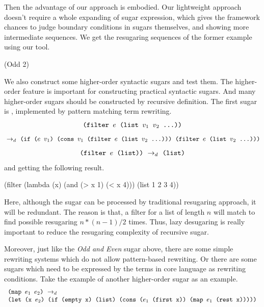 Then the advantage of our approach is embodied. Our lightweight approach doesn't require a whole expanding of sugar expression, which gives the framework chances to judge boundary conditions in sugars themselves, and showing more intermediate sequences. We get the resugaring sequences of the former example using our tool.
\begin{Codes}
    (Odd 2)
\end{Codes}


We also construct some higher-order syntactic sugars and test them. The higher-order feature is important for constructing practical syntactic sugars. And many higher-order sugars should be constructed by recursive definition. The first sugar is , implemented by pattern matching term rewriting.
\[\texttt{(filter $e$ (list $v_1$ $v_2$ ...))}\]
\[
\drule{}
{\Code{(if ($e$ $v_1$) (cons $v_1$ (filter $e$ (list $v_2$ ...)))\ (filter $e$ (list $v_2$ ...)))}}
\]
\[
\texttt{(filter $e$ (list))} ~\rightarrow_d~ \texttt{(list)}
\]
and getting the following result.

\begin{Codes}
    (filter (lambda (x) (and (> x 1) (< x 4))) (list 1 2 3 4))
\end{Codes}

Here, although the sugar can be processed by traditional resugaring approach, it will be redundant. The reason is that, a filter for a list of length $n$ will match to find possible resugaring $n*(n-1)/2$ times. Thus, lazy desugaring is really important to reduce the resugaring complexity of recursive sugar.

Moreover, just like the \emph{Odd and Even} sugar above, there are some simple rewriting systems which do not allow pattern-based rewriting. Or there are some sugars which need to be expressed by the terms in core language as rewriting conditions. Take the example of another higher-order sugar  as an example.
\[
\begin{array}{l}
\texttt{(map $e_1$ $e_2$)} ~\rightarrow_d~\\
\texttt{(let (x $e_2$) (if (empty x) (list) (cons ($e_1$ (first x)) (map $e_1$ (rest x)))))}
\end{array}
\]

